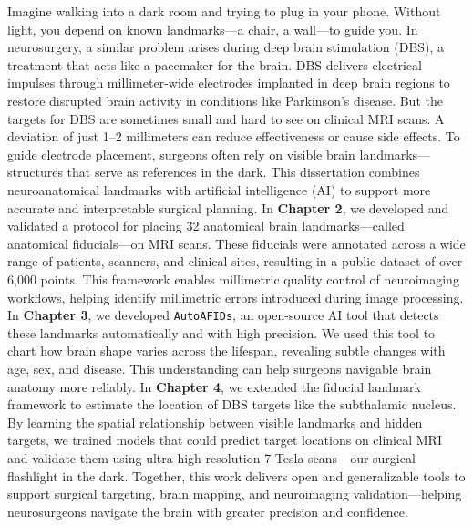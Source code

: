 \onehalfspacing
Imagine walking into a dark room and trying to plug in your phone. Without light, you depend on known landmarks—a chair, a wall—to guide you. In neurosurgery, a similar problem arises during deep brain stimulation (DBS), a treatment that acts like a pacemaker for the brain. DBS delivers electrical impulses through millimeter-wide electrodes implanted in deep brain regions to restore disrupted brain activity in conditions like Parkinson’s disease. But the targets for DBS are sometimes small and hard to see on clinical MRI scans. A deviation of just 1–2 millimeters can reduce effectiveness or cause side effects. To guide electrode placement, surgeons often rely on visible brain landmarks—structures that serve as references in the dark. This dissertation combines neuroanatomical landmarks with artificial intelligence (AI) to support more accurate and interpretable surgical planning. In \textbf{Chapter 2}, we developed and validated a protocol for placing 32 anatomical brain landmarks—called anatomical fiducials—on MRI scans. These fiducials were annotated across a wide range of patients, scanners, and clinical sites, resulting in a public dataset of over 6,000 points. This framework enables millimetric quality control of neuroimaging workflows, helping identify millimetric errors introduced during image processing. In \textbf{Chapter 3}, we developed \texttt{AutoAFIDs}, an open-source AI tool that detects these landmarks automatically and with high precision. We used this tool to chart how brain shape varies across the lifespan, revealing subtle changes with age, sex, and disease. This understanding can help surgeons navigable brain anatomy more reliably. In \textbf{Chapter 4}, we extended the fiducial landmark framework to estimate the location of DBS targets like the subthalamic nucleus. By learning the spatial relationship between visible landmarks and hidden targets, we trained models that could predict target locations on clinical MRI and validate them using ultra-high resolution 7-Tesla scans—our surgical flashlight in the dark. Together, this work delivers open and generalizable tools to support surgical targeting, brain mapping, and neuroimaging validation—helping neurosurgeons navigate the brain with greater precision and confidence.

